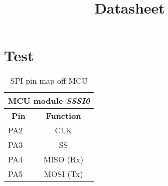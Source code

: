 \documentclass{report}
\title{Datasheet}
\begin{document}
\maketitle

\tableofcontents
\section{Test}



\begin{table}[H]
\centering
\begin{tabular}{|l|c|}
\hline
\multicolumn{2}{|c|}{\textbf{MCU module \textit{SSSI0}}} \\ \hline\hline
\multicolumn{1}{|c|}{\textbf{Pin}}  & \textbf{Function}  \\ \hline
PA2                        & CLK       \\ \hline
PA3                        & SS        \\ \hline
PA4                        & MISO (Rx) \\ \hline
PA5                        & MOSI (Tx) \\ \hline
\end{tabular}
\caption{SPI pin map off MCU}
\label{ta:SPi_pin_MCU}
\end{table}
\end{document}
